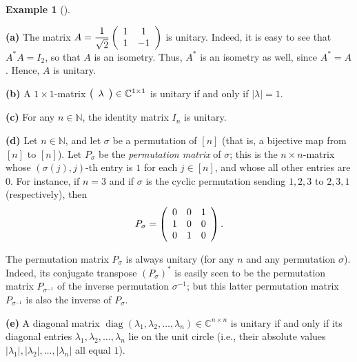 \documentclass[numbers=enddot,12pt,final,onecolumn,notitlepage]{scrartcl}%
\numberwithin{exer}{subsection}
\theoremstyle{definition}
\newtheorem{exam}[theo]{Example}
\newenvironment{example}[1][]
{\begin{exam}[#1]\begin{leftbar}}
{\end{leftbar}\end{exam}}
\begin{document}
\begin{example}
\textbf{(a)} The matrix $A=\dfrac{1}{\sqrt{2}}\left(
\begin{array}
[c]{cc}%
1 & 1\\
1 & -1
\end{array}
\right)  $ is unitary. Indeed, it is easy to see that $A^{\ast}A=I_{2}$, so
that $A$ is an isometry. Thus, $A^{\ast}$ is an isometry as well, since
$A^{\ast}=A$. Hence, $A$ is unitary.

\textbf{(b)} A $1\times1$-matrix $\left(
\begin{array}
[c]{c}%
\lambda
\end{array}
\right)  \in\mathbb{C}^{1\times1}$ is unitary if and only if $\left\vert
\lambda\right\vert =1$.

\textbf{(c)} For any $n\in\mathbb{N}$, the identity matrix $I_{n}$ is unitary.

\textbf{(d)} Let $n\in\mathbb{N}$, and let $\sigma$ be a permutation of
$\left[  n\right]  $ (that is, a bijective map from $\left[  n\right]  $ to
$\left[  n\right]  $). Let $P_{\sigma}$ be the \emph{permutation matrix} of
$\sigma$; this is the $n\times n$-matrix whose $\left(  \sigma\left(
j\right)  ,j\right)  $-th entry is $1$ for each $j\in\left[  n\right]  $, and
whose all other entries are $0$. For instance, if $n=3$ and if $\sigma$ is the
cyclic permutation sending $1,2,3$ to $2,3,1$ (respectively), then%
\[
P_{\sigma}=\left(
\begin{array}
[c]{ccc}%
0 & 0 & 1\\
1 & 0 & 0\\
0 & 1 & 0
\end{array}
\right)  .
\]


The permutation matrix $P_{\sigma}$ is always unitary (for any $n$ and any
permutation $\sigma$). Indeed, its conjugate transpose $\left(  P_{\sigma
}\right)  ^{\ast}$ is easily seen to be the permutation matrix $P_{\sigma
^{-1}}$ of the inverse permutation $\sigma^{-1}$; but this latter permutation
matrix $P_{\sigma^{-1}}$ is also the inverse of $P_{\sigma}$.

\textbf{(e)} A diagonal matrix $\operatorname*{diag}\left(  \lambda
_{1},\lambda_{2},\ldots,\lambda_{n}\right)  \in\mathbb{C}^{n\times n}$ is
unitary if and only if its diagonal entries $\lambda_{1},\lambda_{2}%
,\ldots,\lambda_{n}$ lie on the unit circle (i.e., their absolute values
$\left\vert \lambda_{1}\right\vert ,\left\vert \lambda_{2}\right\vert
,\ldots,\left\vert \lambda_{n}\right\vert $ all equal $1$).
\end{example}
\end{document}
